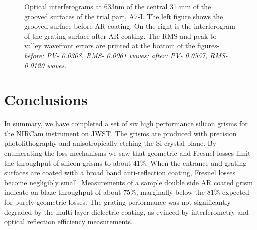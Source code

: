 \begin{figure}
\begin{minipage}[b]{0.5\linewidth}
\begin{center}
\begin{tabular}{c}
   \end{tabular}
   \end{center}
   \end{minipage}
   \caption[Trial part groove interferogram] {\label{fig:im6}  Optical interferograms at 633nm of the central 31 mm of the grooved surfaces of the trial part, A7-I.  The left figure shows the grooved surface before AR coating.  On the right is the interferogram of the grating surface after AR coating.  The RMS and peak to valley wavefront errors are printed at the bottom of the figures- \em{before}\em: PV- 0.0308, RMS- 0.0061 waves; \em{after}\em: PV- 0.0557, RMS- 0.0120 waves.}
   \end{figure} 


\section{Conclusions}
In summary, we have completed a set of six high performance silicon grisms for the NIRCam instrument on JWST.  The grisms are produced with precision photolithography and anisotropically etching the Si crystal plane.  By enumerating the loss mechanisms we saw that geometric and Fresnel losses limit the throughput of silicon grisms to about 41\%.  When the entrance and grating surfaces are coated with a broad band anti-reflection coating, Fresnel losses become negligibly small.  Measurements of a sample double side AR coated grism indicate on blaze throughput of about 75\%, marginally below the 81\% expected for purely geometric losses.  The grating performance was not significantly degraded by the multi-layer dielectric coating, as evinced by interferometry and optical reflection efficiency measurements.
